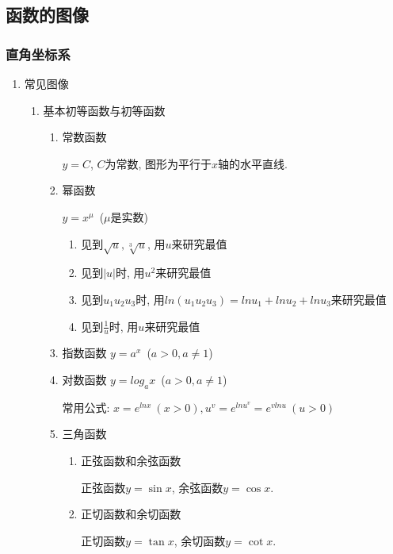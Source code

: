 \subsection{函数的图像}
\subsubsection{直角坐标系}
\begin{enumerate}
\item 常见图像
\begin{enumerate}
\item 基本初等函数与初等函数
\begin{enumerate}
\item 常数函数\par
$ y=C $, $ C $为常数, 图形为平行于$ x $轴的水平直线.
\item 幂函数\par
$ y=x^{\mu} $\ ($ \mu $是实数)
\begin{tcolorbox}
\begin{enumerate}
\item 见到$ \sqrt{u},\sqrt[3]{u} $, 用$ u $来研究最值
\item 见到$ |u| $时, 用$ u^{2} $来研究最值
\item 见到$ u_{1}u_{2}u_{3} $时, 用$ ln(u_{1}u_{2}u_{3})=lnu_{1}+lnu_{2}+lnu_{3} $来研究最值
\item 见到$ \frac{1}{u} $时, 用$ u $来研究最值
\end{enumerate}
\end{tcolorbox}
\item 指数函数
$ y=a^{x} $\ ($ a>0,a\neq 1 $)
\item 对数函数
$ y=log_{a}x $\ ($ a>0,a\neq 1 $)
\begin{tcolorbox}
常用公式: $ x=e^{lnx}\ (x>0), u^{v}=e^{lnu^{v}}=e^{vlnu}\ (u>0) $
\end{tcolorbox}
\item 三角函数
\begin{enumerate}
\item 正弦函数和余弦函数\par
正弦函数$ y=\sin x $, 余弦函数$ y=\cos x $.
\item 正切函数和余切函数\par
正切函数$ y=\tan x $, 余切函数$ y=\cot x $.\par
\begin{figure}[H]
\centering
\begin{subfigure}{.475\linewidth}
\centering
\begin{tikzpicture}[
]

\end{tikzpicture}
\end{subfigure}
\end{figure}
\end{enumerate}
\end{enumerate}
\end{enumerate}
\end{enumerate}
